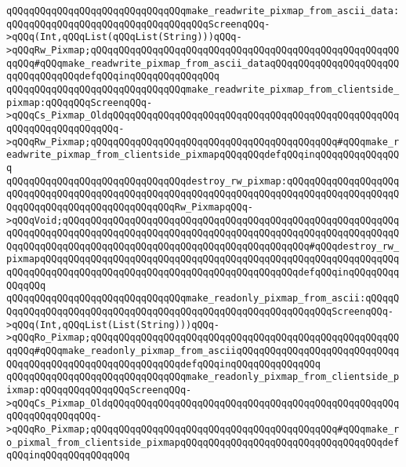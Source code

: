 \verb|qQQqqQQqqQQqqQQqqQQqqQQqqQQqqQQqmake_readwrite_pixmap_from_ascii_data:qQQqqQQqqQQqqQQqqQQqqQQqqQQqqQQqqQQqScreenqQQq->qQQq(Int,qQQqList(qQQqList(String)))qQQq->qQQqRw_Pixmap;qQQqqQQqqQQqqQQqqQQqqQQqqQQqqQQqqQQqqQQqqQQqqQQqqQQqqQQqqQQq#qQQqmake_readwrite_pixmap_from_ascii_dataqQQqqQQqqQQqqQQqqQQqqQQqqQQqqQQqqQQqdefqQQqinqQQqqQQqqQQqqQQq|\newline
\verb|qQQqqQQqqQQqqQQqqQQqqQQqqQQqqQQqmake_readwrite_pixmap_from_clientside_pixmap:qQQqqQQqScreenqQQq->qQQqCs_Pixmap_OldqQQqqQQqqQQqqQQqqQQqqQQqqQQqqQQqqQQqqQQqqQQqqQQqqQQqqQQqqQQqqQQqqQQqqQQq->qQQqRw_Pixmap;qQQqqQQqqQQqqQQqqQQqqQQqqQQqqQQqqQQqqQQqqQQq#qQQqmake_readwrite_pixmap_from_clientside_pixmapqQQqqQQqdefqQQqinqQQqqQQqqQQqqQQq|\newline
\newline
\verb|qQQqqQQqqQQqqQQqqQQqqQQqqQQqqQQqdestroy_rw_pixmap:qQQqqQQqqQQqqQQqqQQqqQQqqQQqqQQqqQQqqQQqqQQqqQQqqQQqqQQqqQQqqQQqqQQqqQQqqQQqqQQqqQQqqQQqqQQqqQQqqQQqqQQqqQQqqQQqqQQqqQQqRw_PixmapqQQq->qQQqVoid;qQQqqQQqqQQqqQQqqQQqqQQqqQQqqQQqqQQqqQQqqQQqqQQqqQQqqQQqqQQqqQQqqQQqqQQqqQQqqQQqqQQqqQQqqQQqqQQqqQQqqQQqqQQqqQQqqQQqqQQqqQQqqQQqqQQqqQQqqQQqqQQqqQQqqQQqqQQqqQQqqQQqqQQqqQQqqQQqqQQqqQQq#qQQqdestroy_rw_pixmapqQQqqQQqqQQqqQQqqQQqqQQqqQQqqQQqqQQqqQQqqQQqqQQqqQQqqQQqqQQqqQQqqQQqqQQqqQQqqQQqqQQqqQQqqQQqqQQqqQQqqQQqqQQqqQQqqQQqdefqQQqinqQQqqQQqqQQqqQQq|\newline
\newline
\verb|qQQqqQQqqQQqqQQqqQQqqQQqqQQqqQQqmake_readonly_pixmap_from_ascii:qQQqqQQqqQQqqQQqqQQqqQQqqQQqqQQqqQQqqQQqqQQqqQQqqQQqqQQqqQQqqQQqScreenqQQq->qQQq(Int,qQQqList(List(String)))qQQq->qQQqRo_Pixmap;qQQqqQQqqQQqqQQqqQQqqQQqqQQqqQQqqQQqqQQqqQQqqQQqqQQqqQQqqQQq#qQQqmake_readonly_pixmap_from_asciiqQQqqQQqqQQqqQQqqQQqqQQqqQQqqQQqqQQqqQQqqQQqqQQqqQQqqQQqqQQqdefqQQqinqQQqqQQqqQQqqQQq|\newline
\verb|qQQqqQQqqQQqqQQqqQQqqQQqqQQqqQQqmake_readonly_pixmap_from_clientside_pixmap:qQQqqQQqqQQqqQQqScreenqQQq->qQQqCs_Pixmap_OldqQQqqQQqqQQqqQQqqQQqqQQqqQQqqQQqqQQqqQQqqQQqqQQqqQQqqQQqqQQqqQQqqQQq->qQQqRo_Pixmap;qQQqqQQqqQQqqQQqqQQqqQQqqQQqqQQqqQQqqQQqqQQq#qQQqmake_ro_pixmal_from_clientside_pixmapqQQqqQQqqQQqqQQqqQQqqQQqqQQqqQQqqQQqdefqQQqinqQQqqQQqqQQqqQQq|\newline
